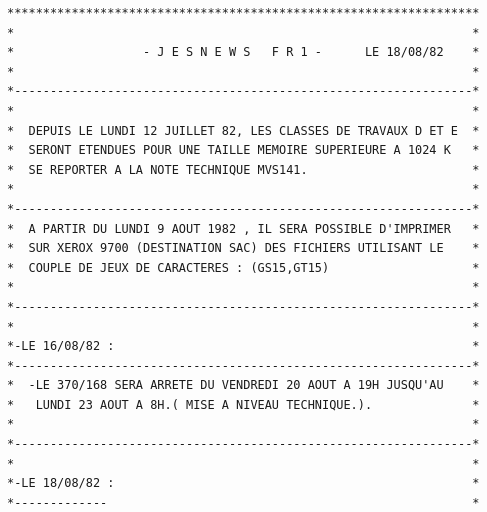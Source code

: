 \begin{verbatim}
******************************************************************
*                                                                *
*                  - J E S N E W S   F R 1 -      LE 18/08/82    *
*                                                                *
*----------------------------------------------------------------*
*                                                                *
*  DEPUIS LE LUNDI 12 JUILLET 82, LES CLASSES DE TRAVAUX D ET E  *
*  SERONT ETENDUES POUR UNE TAILLE MEMOIRE SUPERIEURE A 1024 K   *
*  SE REPORTER A LA NOTE TECHNIQUE MVS141.                       *
*                                                                *
*----------------------------------------------------------------*
*  A PARTIR DU LUNDI 9 AOUT 1982 , IL SERA POSSIBLE D'IMPRIMER   *
*  SUR XEROX 9700 (DESTINATION SAC) DES FICHIERS UTILISANT LE    *
*  COUPLE DE JEUX DE CARACTERES : (GS15,GT15)                    *
*                                                                *
*----------------------------------------------------------------*
*                                                                *
*-LE 16/08/82 :                                                  *
*----------------------------------------------------------------*
*  -LE 370/168 SERA ARRETE DU VENDREDI 20 AOUT A 19H JUSQU'AU    *
*   LUNDI 23 AOUT A 8H.( MISE A NIVEAU TECHNIQUE.).              *
*                                                                *
*----------------------------------------------------------------*
*                                                                *
*-LE 18/08/82 :                                                  *
*-------------                                                   *
\end{verbatim}
